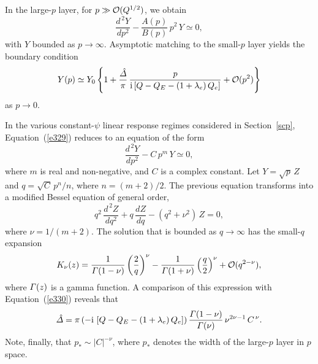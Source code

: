 \documentclass[notitlepage,12pt]{article}
\begin{document}
In the large-$p$ layer, for  $p\gg {\cal O}(Q^{1/2})$, we obtain 
\begin{equation}\label{e329}
\frac{d^{\,2} Y}{dp^2} - \frac{A(p)}{B(p)}\,p^2\,Y\simeq 0,
\end{equation}
with $Y$ bounded as $p\rightarrow \infty$. Asymptotic matching to the small-$p$ layer yields the boundary
condition 
\begin{equation}\label{e330}
Y(p)\simeq Y_0\left\{1+ \frac{\hat{\mit\Delta}}{\pi}\,\frac{p}{{\rm i}\,[Q-Q_E-(1+\lambda_e)\,Q_e]}+ {\cal O}(p^2)\right\}
\end{equation}
as $p\rightarrow 0$. 

In the various constant-$\psi$ linear response regimes considered in Section~\ref{scp}, Equation~(\ref{e329}) reduces to an
equation of the form
\begin{equation}\label{e330a}
\frac{d^{\,2}Y}{dp^2}- C\,p^m\,Y\simeq 0,
\end{equation}
where $m$ is real and non-negative, and $C$ is a complex constant. Let $Y=\sqrt{p}\,Z$ and $q=\sqrt{C}\,p^n/n$, where
$n=(m+2)/2$. The previous equation transforms into a modified Bessel equation of general order, 
\begin{equation}
q^2\,\frac{d^{\,2}Z}{dq^2} + q\,\frac{dZ}{dq} - (q^2+\nu^2)\,Z =0,
\end{equation}
where $\nu=1/(m+2)$. The solution that is bounded as $q\rightarrow \infty$ has the small-$q$
expansion
\begin{equation}\label{e332}
K_\nu(z)= \frac{1}{{\mit\Gamma}(1-\nu)}\left(\frac{2}{q}\right)^\nu - \frac{1}{{\mit\Gamma}(1+\nu)}\left(\frac{q}{2}\right)^\nu + {\cal O}(q^{2-\nu}),
\end{equation}
where ${\mit\Gamma}(z)$ is a gamma function. 
A comparison of this expression with Equation~(\ref{e330}) reveals that
\begin{equation}
\hat{\mit\Delta} = \pi\,(-{\rm i}\,\left[Q-Q_E-(1+\lambda_e)\,Q_e\right])\, \frac{{\mit\Gamma}(1-\nu)}{{\mit\Gamma}(\nu)}\,\nu^{2\nu-1}\,C^{\,\nu}.
\end{equation}
Note, finally, that $p_\ast\sim |C|^{-\nu}$, where $p_\ast$ denotes the width of the large-$p$ layer in $p$ space.
\end{document}
